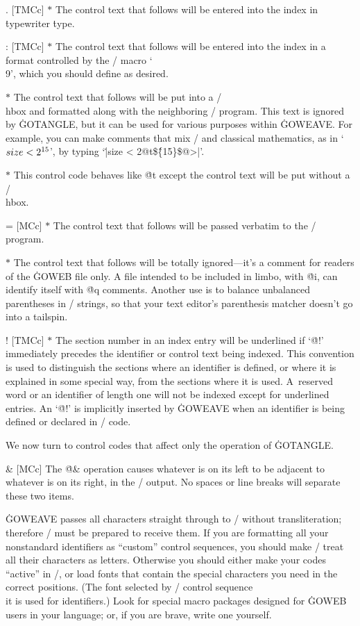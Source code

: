 \@. [TMCc] $*$ The control text that follows will be entered into the index
in \.{typewriter} \.{type}.

\@: [TMCc] $*$ The control text that follows will be entered into the index
in a format controlled by the \TEX/ macro `\.{\\9}', which you
should define as desired.

\@t [MCc] $*$ The control text that follows will
be put into a \TEX/ \.{\\hbox} and formatted along with the neighboring
\GO/ program. This text is ignored by \.{GOTANGLE}, but it can be used
for various purposes within \.{GOWEAVE}. For example, you can make comments
that mix \GO/ and classical mathematics, as in `$\\{size}<2^{15}$', by
typing `\.{|size < 2@t\$\^\{15\}\$@>|}'.

\@r [MCc] $*$ This control code behaves like \.{@t} except the control text
will be put without a \TEX/ \.{\\hbox}.

\@= [MCc] $*$ The control text that follows will
be passed verbatim to the \GO/ program.

\@q [LTMCc] $*$ The control text that follows will
be totally ignored---it's a comment for readers of the \.{GOWEB} file only.
A file intended to be included in
limbo, with \.{@i}, can identify itself with \.{@q} comments.
Another use is to balance unbalanced parentheses in \GO/ strings,
so that your text editor's parenthesis matcher doesn't go into a tailspin.

\@! [TMCc] $*$
The section number in an index entry will be underlined if `\.{@!}'
immediately precedes the identifier or control text being indexed. This
convention is used to distinguish the sections where an identifier is
defined, or where it is explained in some special way, from the sections
where it is used. A~reserved word or an identifier of length one will not
be indexed except for underlined entries. An `\.{@!}' is implicitly inserted
by \.{GOWEAVE} when an identifier is being defined or declared in \GO/
code.

\subsec
We now turn to control codes that affect only the operation of
\.{GOTANGLE}.

\@\& [MCc] The \.{@\&} operation causes whatever is on its left to be
adjacent to whatever is on its right, in the \GO/ output. No spaces or
line breaks will separate these two items.

\more
\.{GOWEAVE} passes all characters straight through to \TEX/ without
transliteration; therefore \TEX/ must be prepared to receive them.
If you are formatting all your nonstandard identifiers as ``custom''
control sequences, you should
make \TEX/ treat all their characters as letters. Otherwise you should either
make your codes ``active'' in \TEX/, or load fonts that
contain the special characters you need in the correct positions.
(The font selected by \TEX/ control sequence \.{\\it} is used for
identifiers.)
Look for special macro packages designed for \.{GOWEB} users in your language;
or, if you are brave, write one yourself.

